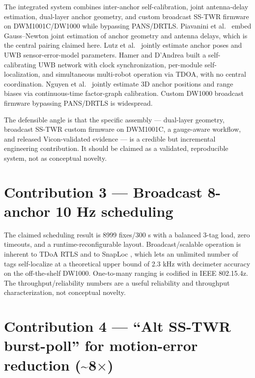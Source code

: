 The integrated system combines inter-anchor self-calibration, joint antenna-delay estimation, dual-layer anchor geometry, and custom broadcast SS-TWR firmware on DWM1001C/DW1000 while bypassing PANS/DRTLS. Piavanini et al.\ \cite{piavanini2022selfcalibrating,piavanini2022calibration} embed Gauss--Newton joint estimation of anchor geometry and antenna delays, which is the central pairing claimed here. Lutz et al.\ \cite{lutz2019visual} jointly estimate anchor poses and UWB sensor-error-model parameters. Hamer and D'Andrea \cite{hamer2018selfcalibrating} built a self-calibrating UWB network with clock synchronization, per-module self-localization, and simultaneous multi-robot operation via TDOA, with no central coordination. Nguyen et al.\ \cite{nguyen2025coordinate} jointly estimate 3D anchor positions and range biases via continuous-time factor-graph calibration. Custom DW1000 broadcast firmware bypassing PANS/DRTLS is widespread.

The defensible angle is that the specific assembly --- dual-layer geometry, broadcast SS-TWR custom firmware on DWM1001C, a gauge-aware workflow, and released Vicon-validated evidence --- is a credible but incremental engineering contribution. It should be claimed as a validated, reproducible system, not as conceptual novelty.

\section{Contribution 3 --- Broadcast 8-anchor 10 Hz scheduling}


The claimed scheduling result is 8999 fixes/300 s with a balanced 3-tag load, zero timeouts, and a runtime-reconfigurable layout. Broadcast/scalable operation is inherent to TDoA RTLS and to SnapLoc \cite{grosswindhager2019snaploc}, which lets an unlimited number of tags self-localize at a theoretical upper bound of 2.3 kHz with decimeter accuracy on the off-the-shelf DW1000. One-to-many ranging is codified in IEEE 802.15.4z. The throughput/reliability numbers are a useful reliability and throughput characterization, not conceptual novelty.

\section{Contribution 4 --- ``Alt SS-TWR burst-poll'' for motion-error reduction (\texorpdfstring{\textasciitilde{}8$\times$}{~8x})}

